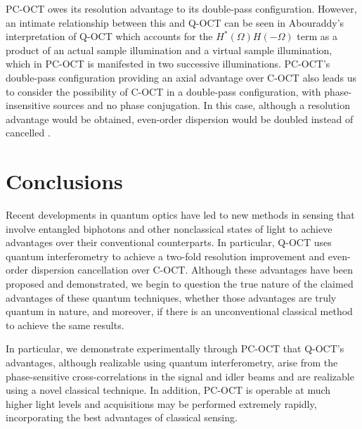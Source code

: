 PC-OCT owes its resolution advantage to its double-pass configuration. However, an intimate relationship between this and Q-OCT can be seen in Abouraddy's interpretation of Q-OCT \cite{abouraddy-qoct} which accounts for the $H^*(\Omega)H(-\Omega)$ term as a product of an actual sample illumination and a virtual sample illumination, which in PC-OCT is manifested in two successive illuminations. PC-OCT's double-pass configuration providing an axial advantage over C-OCT also leads us to consider the possibility of C-OCT in a double-pass configuration, with phase-insensitive sources and no phase conjugation. In this case, although a resolution advantage would be obtained, even-order dispersion would be doubled instead of cancelled \cite{erkmen-pcoct}.

\section{Conclusions}

Recent developments in quantum optics have led to new methods in sensing that involve entangled biphotons and other nonclassical states of light to achieve advantages over their conventional counterparts. In particular, Q-OCT uses quantum interferometry to achieve a two-fold resolution improvement and even-order dispersion cancellation over C-OCT. Although these advantages have been proposed and demonstrated, we begin to question the true nature of the claimed advantages of these quantum techniques, whether those advantages are truly quantum in nature, and moreover, if there is an unconventional classical method to achieve the same results.

In particular, we demonstrate experimentally through PC-OCT that Q-OCT's advantages, although realizable using quantum interferometry, arise from the phase-sensitive cross-correlations in the signal and idler beams and are realizable using a novel classical technique. In addition, PC-OCT is operable at much higher light levels and acquisitions may be performed extremely rapidly, incorporating the best advantages of classical sensing.

